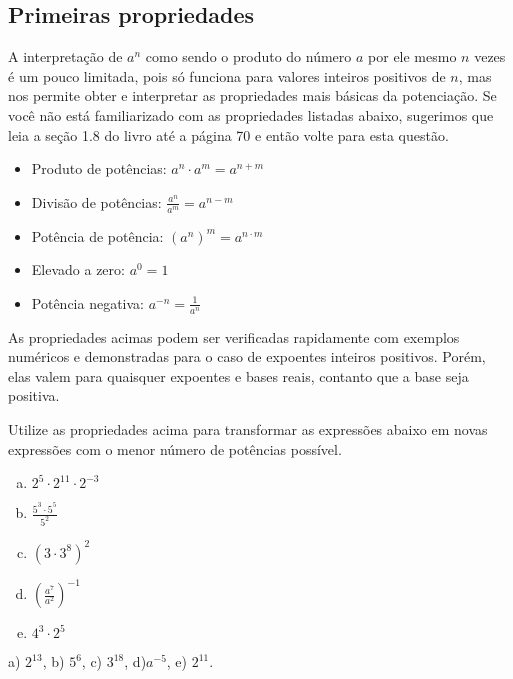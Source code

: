 \documentclass[main.tex]{subfiles}
\begin{document}
\subsection*{Primeiras propriedades}

A interpretação de $a^n$ como sendo o produto do número $a$ por ele mesmo $n$ vezes é um pouco limitada, pois só funciona para valores inteiros positivos de $n$, mas nos permite obter e interpretar as propriedades mais básicas da potenciação. Se você não está familiarizado com as propriedades listadas abaixo, sugerimos que leia a seção 1.8 do livro  até a página 70 e então volte para esta questão.

\begin{caixaExemplo}
\begin{itemize}
 \item Produto de potências: $a^n \cdot a^m = a^{n+m}$
 \item Divisão de potências: $\frac{a^n}{a^m} = a^{n-m}$
 \item Potência de potência: $(a^n)^m = a^{n \cdot m}$
 \item Elevado a zero: $a^0 = 1$
 \item Potência negativa: $a^{-n} = \frac{1}{a^n}$
\end{itemize}
\end{caixaExemplo}

As propriedades acimas podem ser verificadas rapidamente com exemplos numéricos e demonstradas para o caso de expoentes inteiros positivos. Porém, elas valem para quaisquer expoentes e bases reais, contanto que a base seja positiva.

\begin{questao}
Utilize as propriedades acima para transformar as expressões abaixo em novas expressões com o menor número de potências possível.
\begin{enumerate}[a)]
\item $2^5 \cdot 2^{11} \cdot 2^{-3}$
\item $\frac{5^3 \cdot 5^5}{5^2}$
\item $(3 \cdot 3^8)^2$
\item $(\frac{a^7}{a^2})^{-1}$
\item $4^3 \cdot 2^5$
\end{enumerate}
\end{questao}


\begin{gabarito}
	\begin{gabaritoQuestao}
		a) $2^{13}$, b) $5^6$, c) $3^{18}$, d)$a^{-5}$, e) $2^{11}$.
	\end{gabaritoQuestao}
\end{gabarito}
\end{document}
